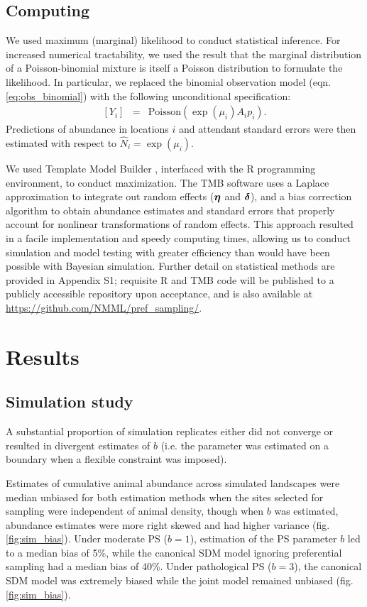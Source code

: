 \documentclass[times,mee,doublespace,]{besauth2}
\begin{document}
\subsection{Computing}

We used maximum (marginal) likelihood to conduct statistical inference. For increased numerical tractability, we used the result that the marginal distribution of a Poisson-binomial mixture is itself a Poisson distribution to formulate the likelihood.  In particular, we replaced the binomial observation model (eqn. \ref{eq:obs_binomial}) with the following unconditional specification:
\begin{eqnarray}
\label{eq:obs_pois}
   [Y_i] & = & \text{Poisson}(\exp(\mu_i) A_i p_i).
\end{eqnarray}
Predictions of abundance in locations $i$ and attendant standard errors were then estimated with respect to $\hat{N}_i = \exp(\mu_i)$.

We used Template Model Builder \citep[TMB; ][]{KristensenEtAl2016}, interfaced with the R programming environment, to conduct maximization. The TMB software uses a Laplace approximation to integrate out random effects ($\boldsymbol{\eta}$ and $\boldsymbol{\delta}$), and a bias correction algorithm \citep{TierneyEtAl1989,ThorsonKristensen2016} to obtain abundance estimates and standard errors that properly account for nonlinear transformations of random effects.  This approach resulted in a facile implementation and speedy computing times, allowing us to conduct simulation and model testing with greater efficiency than would have been possible with Bayesian simulation.  Further detail on statistical methods are provided in Appendix S1; requisite R and TMB code will be published to a publicly accessible repository upon acceptance, and is also available at \url{https://github.com/NMML/pref_sampling/}.

\section{Results}

\subsection{Simulation study}

A substantial proportion of simulation replicates either did not converge or resulted in divergent estimates of $b$ (i.e. the parameter was estimated on a boundary when a flexible constraint was imposed).

Estimates of cumulative animal abundance across simulated landscapes were median unbiased for both estimation methods when the sites selected for sampling were independent of animal density, though when $b$ was estimated, abundance estimates were more right skewed and had higher variance (fig. \ref{fig:sim_bias}).  Under moderate PS ($b=1$), estimation of the PS parameter $b$ led to a median bias of 5\%, while the canonical SDM model ignoring preferential sampling had a median bias of 40\%.  Under pathological PS ($b=3$), the canonical SDM model was extremely biased while the joint model remained unbiased (fig. \ref{fig:sim_bias}).
\end{document}
